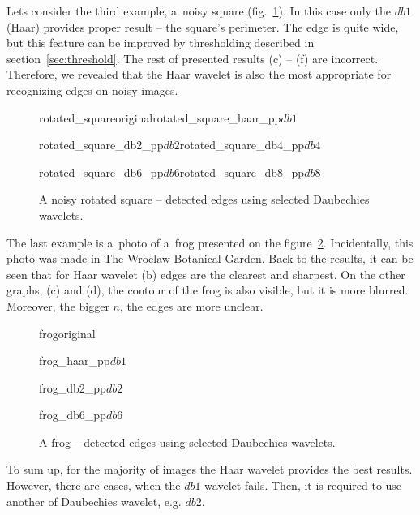 Lets consider the third example, a~noisy square (fig.~\ref{fig:rotated_square_daubechies}). In this case only the $db1$ (Haar) provides proper result -- the square's perimeter. The edge is quite wide, but this feature can be improved by thresholding described in section~\ref{sec:threshold}. The rest of presented results (c) -- (f) are incorrect. Therefore, we revealed that the Haar wavelet is also the most appropriate for recognizing edges on noisy images. 

\begin{figure}[h]
	\centering
	\begin{subdiagrams2}{rotated_square}{original}{rotated_square_haar_pp}{$db1$}
	\end{subdiagrams2}

	\begin{subdiagrams2}{rotated_square_db2_pp}{$db2$}{rotated_square_db4_pp}{$db4$}
	\end{subdiagrams2}
	
	\begin{subdiagrams2}{rotated_square_db6_pp}{$db6$}{rotated_square_db8_pp}{$db8$}
	\end{subdiagrams2}
	
	\caption{A noisy rotated square -- detected edges using selected Daubechies wavelets.}
	\label{fig:rotated_square_daubechies}
\end{figure}

The last example is a~photo of a~frog presented on the figure~\ref{fig:frog_daubechies}. Incidentally, this photo was made in The Wroclaw Botanical Garden. Back to the results, it can be seen that for Haar wavelet (b) edges are the clearest and sharpest. On the other graphs, (c) and (d), the contour of the frog is also visible, but it is more blurred. Moreover, the bigger $n$, the edges are more unclear.

\begin{figure}[h]
	\centering
	\begin{subdiagram}{frog}{original}
	\end{subdiagram}

	\begin{subdiagram}{frog_haar_pp}{$db1$}
	\end{subdiagram}
	
	\begin{subdiagram}{frog_db2_pp}{$db2$}
	\end{subdiagram}

	\begin{subdiagram}{frog_db6_pp}{$db6$}
	\end{subdiagram}
	
	\caption{A frog -- detected edges using selected Daubechies wavelets.}
	\label{fig:frog_daubechies}
\end{figure}

To sum up, for the majority of images the Haar wavelet provides the best results. However, there are cases, when the $db1$ wavelet fails. Then, it is required to use another of Daubechies wavelet, e.g. $db2$.

